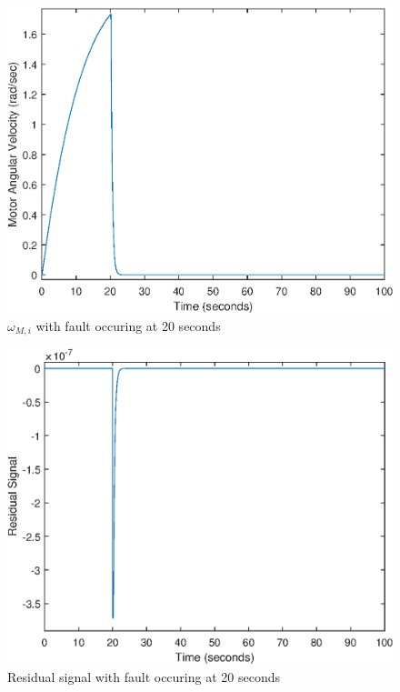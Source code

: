 \begin{figure}
	\centering
	\includegraphics[width=120mm]{figures/omega_reconfig}
	\caption{$\omega_{M,i}$ with fault occuring at 20 seconds}
\end{figure} 


\begin{figure}
	\centering
	\includegraphics[width=120mm]{figures/residual_reconfig}
	\caption{Residual signal with fault occuring at 20 seconds}
\end{figure} 